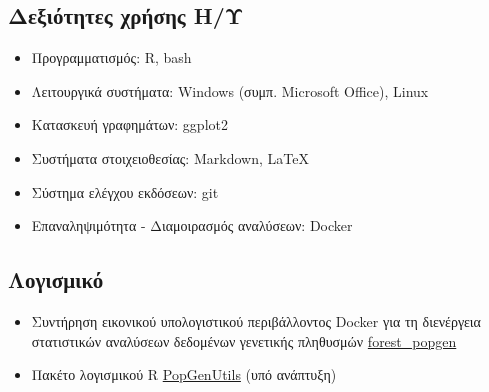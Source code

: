 \documentclass[12pt,]{scrartcl}
\begin{document}
\subsection{Δεξιότητες χρήσης Η/Υ}\label{it}
\begin{itemize}
\vspace{-3mm}
\setlength\itemsep{-0.6em}
\item Προγραμματισμός: R, bash
\item Λειτουργικά συστήματα: Windows (συμπ. Microsoft Office), Linux
\item Κατασκευή γραφημάτων: ggplot2 %
\item Συστήματα στοιχειοθεσίας: Markdown, \LaTeX
\item Σύστημα ελέγχου εκδόσεων: git
\item Επαναληψιμότητα - Διαμοιρασμός αναλύσεων: Docker %
\end{itemize}

\subsection{Λογισμικό}\label{software}
\begin{itemize}
\vspace{-3mm}
\setlength\itemsep{-0.6em}

\item Συντήρηση εικονικού υπολογιστικού περιβάλλοντος Docker για τη διενέργεια στατιστικών αναλύσεων δεδομένων γενετικής πληθυσμών 
\href{https://github.com/nikostourvas/forest_popgen}{forest\_popgen}

\item Πακέτο λογισμικού R \href{https://github.com/nikostourvas/PopGenUtils}{PopGenUtils} (υπό ανάπτυξη)

\end{itemize}
\end{document}
